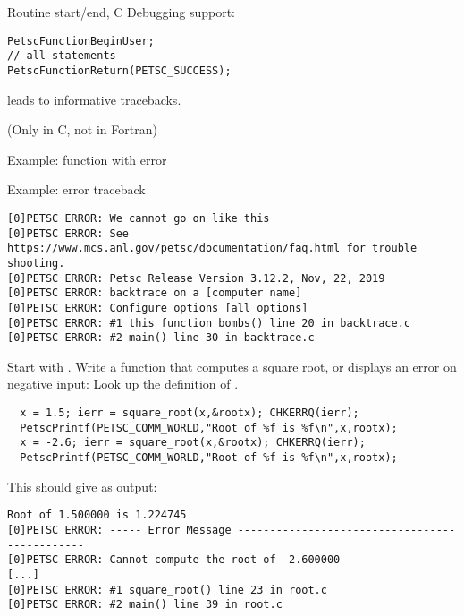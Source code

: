 \begin{c}
\begin{numberedframe}{Routine start/end, C}
Debugging support:
\begin{lstlisting}
PetscFunctionBeginUser;
// all statements
PetscFunctionReturn(PETSC_SUCCESS);
\end{lstlisting}
leads to informative tracebacks.

(Only in C, not in Fortran)
\end{numberedframe}
\end{c}

\begin{numberedframe}{Example: function with error}
\end{numberedframe}

\begin{numberedframe}{Example: error traceback}
\footnotesize
\begin{verbatim}
[0]PETSC ERROR: We cannot go on like this
[0]PETSC ERROR: See https://www.mcs.anl.gov/petsc/documentation/faq.html for trouble shooting.
[0]PETSC ERROR: Petsc Release Version 3.12.2, Nov, 22, 2019
[0]PETSC ERROR: backtrace on a [computer name]
[0]PETSC ERROR: Configure options [all options]
[0]PETSC ERROR: #1 this_function_bombs() line 20 in backtrace.c
[0]PETSC ERROR: #2 main() line 30 in backtrace.c
\end{verbatim}
\end{numberedframe}

\begin{exerciseframe}[root]
Start with . Write a function that computes a square root,
or displays an error on negative input:
Look up the definition of .
\begin{lstlisting}
  x = 1.5; ierr = square_root(x,&rootx); CHKERRQ(ierr);
  PetscPrintf(PETSC_COMM_WORLD,"Root of %f is %f\n",x,rootx);
  x = -2.6; ierr = square_root(x,&rootx); CHKERRQ(ierr);
  PetscPrintf(PETSC_COMM_WORLD,"Root of %f is %f\n",x,rootx);
\end{lstlisting}
This should give as output:

\begingroup \tiny
\begin{verbatim}
Root of 1.500000 is 1.224745
[0]PETSC ERROR: ----- Error Message ----------------------------------------------
[0]PETSC ERROR: Cannot compute the root of -2.600000
[...]
[0]PETSC ERROR: #1 square_root() line 23 in root.c
[0]PETSC ERROR: #2 main() line 39 in root.c
\end{verbatim}
\endgroup
\end{exerciseframe}


